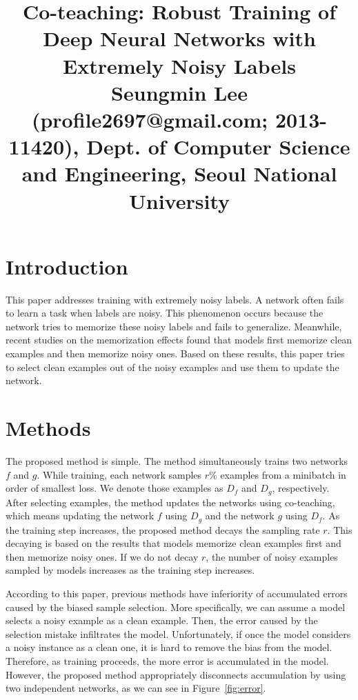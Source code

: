 \documentclass[10pt,twocolumn,letterpaper]{article}
\begin{document}
\title{Co-teaching: Robust Training of Deep Neural Networks with Extremely Noisy Labels \\ {\rm {\normalsize Seungmin Lee (profile2697@gmail.com; 2013-11420), Dept. of Computer Science and Engineering, Seoul National University}}} 

\maketitle
\thispagestyle{empty}


\section{Introduction}
This paper addresses training with extremely noisy labels. A network often fails to learn a task when labels are noisy. This phenomenon occurs because the network tries to memorize these noisy labels and fails to generalize. Meanwhile, recent studies on the memorization effects found that models first memorize clean examples and then memorize noisy ones. Based on these results, this paper tries to select clean examples out of the noisy examples and use them to update the network.

\section{Methods} 
The proposed method is simple. The method simultaneously trains two networks $f$ and $g$. While training, each network samples $r$\% examples from a minibatch in order of smallest loss. We denote those examples as $D_f$ and $D_g$, respectively. After selecting examples, the method updates the networks using co-teaching, which means updating the network $f$ using $D_g$ and the network $g$ using $D_f$. As the training step increases, the proposed method decays the sampling rate  $r$. This decaying is based on the results that models memorize clean examples first and then memorize noisy ones. If we do not decay $r$, the number of noisy examples sampled by models increases as the training step increases.

According to this paper, previous methods have inferiority of accumulated errors caused by the biased sample selection. More specifically, we can assume a model selects a noisy example as a clean example. Then, the error caused by the selection mistake infiltrates the model. Unfortunately, if once the model considers a noisy instance as a clean one, it is hard to remove the bias from the model. Therefore, as training proceeds, the more error is accumulated in the model. However, the proposed method appropriately disconnects accumulation by using two independent networks, as we can see in Figure~\ref{fig:error}.
\end{document}
